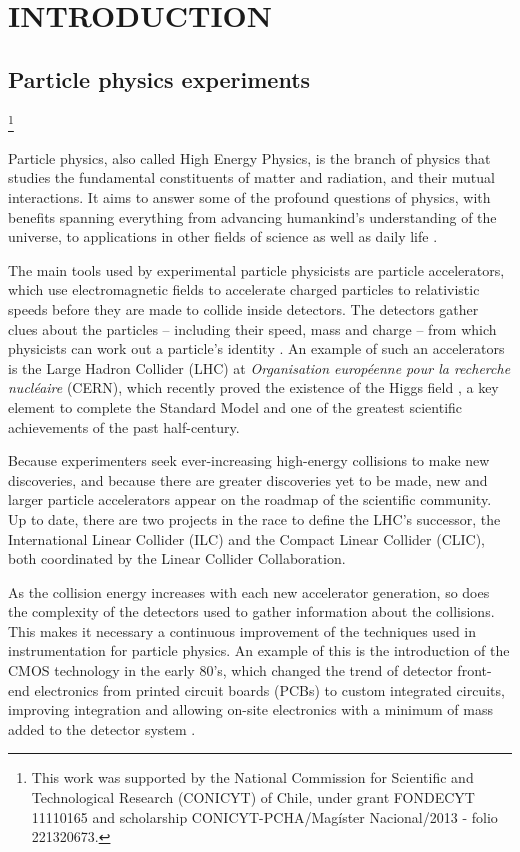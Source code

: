 \newcommand\blfootnote[1]{%
  \begingroup
  \renewcommand\thefootnote{}\footnote{#1}%
  \addtocounter{footnote}{-1}%
  \endgroup
}

\chapter{INTRODUCTION}
\label{chapter:introduction}
\section{Particle physics experiments}
\blfootnote{This work was supported by the National Commission for Scientific and Technological Research (CONICYT) of Chile, under grant FONDECYT 11110165 and scholarship CONICYT-PCHA/Mag\'ister Nacional/2013 - folio 221320673.} Particle physics, also called High Energy Physics, is the branch of physics that studies the fundamental constituents of matter and radiation, and their mutual interactions. It aims to answer some of the profound questions of physics, with benefits spanning everything from advancing humankind’s understanding of the universe, to applications in other fields of science as well as daily life \citep{tuttle101}.

The main tools used by experimental particle physicists are particle accelerators, which use electromagnetic fields to accelerate charged particles to relativistic speeds before they are made to collide inside detectors. The detectors gather clues about the particles – including their speed, mass and charge – from which physicists can work out a particle's identity \citep{cern101}. An example of such an accelerators is the Large Hadron Collider (LHC) at \emph{Organisation européenne pour la recherche nucléaire} (CERN), which recently proved the existence of the Higgs field \citep{Aad:2012tfa, Chatrchyan:2012ufa}, a key element to complete the Standard Model and one of the greatest scientific achievements of the past \mbox{half-century.}

Because experimenters seek ever-increasing high-energy collisions to make new discoveries, and because there are greater discoveries yet to be made, new and larger particle accelerators appear on the roadmap of the scientific community. Up to date, there are two projects in the race to define the LHC's successor, the International Linear Collider (ILC) and the Compact Linear Collider (CLIC), both coordinated by the Linear Collider Collaboration. 

As the collision energy increases with each new accelerator generation, so does the complexity of the detectors used to gather information about the collisions. This makes it necessary a continuous improvement of the techniques used in instrumentation for particle physics. An example of this is the introduction of the CMOS technology in the early 80's, which changed the trend of detector front-end electronics from printed circuit boards (PCBs) to custom integrated circuits, improving integration and allowing on-site electronics with a minimum of mass added to the detector system \citep{abuslemethesis}. 

